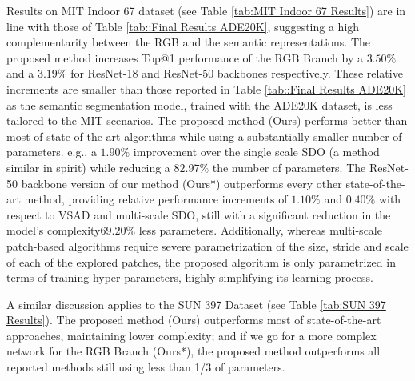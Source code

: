 \documentclass[review, 3p, sort&compress]{elsarticle}
\begin{document}
Results on MIT Indoor 67 dataset (see Table \ref{tab:MIT Indoor 67 Results}) are in line with those of Table \ref{tab::Final Results ADE20K}, suggesting a high complementarity between the RGB and the semantic representations. The proposed method increases Top@1 performance of the RGB Branch by a \(3.50 \%\) and a \(3.19 \%\) for ResNet-18 and ResNet-50 backbones respectively. These relative increments are smaller than those reported in Table \ref{tab::Final Results ADE20K} as the semantic segmentation model, trained with the ADE20K dataset, is less tailored to the MIT scenarios. The proposed method (Ours) performs better than most of state-of-the-art algorithms while using a substantially smaller number of parameters. e.g., a \(1.90 \%\) improvement over the single scale SDO \cite{cheng2018scene} (a method similar in spirit) while reducing a \(82.97 \%\) the number of parameters. The ResNet-50 backbone version of our method (Ours*) outperforms every other state-of-the-art method, providing relative performance increments of \(1.10 \%\) and \(0.40 \%\) with respect to VSAD and multi-scale SDO, still with a significant reduction in the model's complexity\textemdash \(69.20\%\) less parameters. Additionally, whereas multi-scale patch-based algorithms require severe parametrization of the size, stride and scale of each of the explored patches, the proposed algorithm is only parametrized in terms of training hyper-parameters, highly simplifying its learning process.

A similar discussion applies to the SUN 397 Dataset (see Table \ref{tab:SUN 397 Results}). The proposed method (Ours) outperforms most of state-of-the-art approaches, maintaining lower complexity; and if we go for a more complex network for the RGB Branch (Ours*), the proposed method outperforms all reported methods still using less than 1/3 of parameters.
\end{document}
